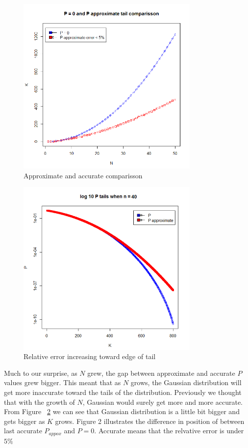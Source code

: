 \documentclass[12pt]{article}
\begin{document}
\begin{figure}[!h]
	\centering
  \includegraphics[width=0.8\textwidth]{T0vsN}
	\caption{Approximate and accurate comparisson}
	\label{fig:T0vsN}
\end{figure}

\begin{figure}[!h]
	\centering
  \includegraphics[width=0.8\textwidth]{log10PtailsN40}
	\caption{Relative error increasing toward edge of tail}
	\label{fig:log10PtailsN40}
\end{figure}

Much to our surprise, as $N$ grew, the gap between approximate and accurate $P$ values grew bigger. This meant that as $N$ grows, the Gaussian distribution will get more inaccurate toward the tails of the distribution. Previously we thought that with the growth of $N$, Gaussian would surely get more and more accurate.
From Figure ~\ref{fig:log10PtailsN40} we can see that Gaussian distribution is a little bit bigger and gets bigger as $K$ grows. Figure 2 illustrates the difference in position of between last accurate $P_{appox}$ and $P = 0$. Accurate means that the relvative error is under $5\%$
\end{document}
